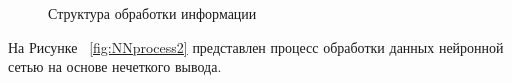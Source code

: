\begin{figure}[ht]
    \caption{Структура обработки информации}\label{fig:NNprocess1}
\end{figure}
На Рисунке ~\cref{fig:NNprocess2} представлен процесс обработки данных нейронной сетью на основе нечеткого вывода. 
